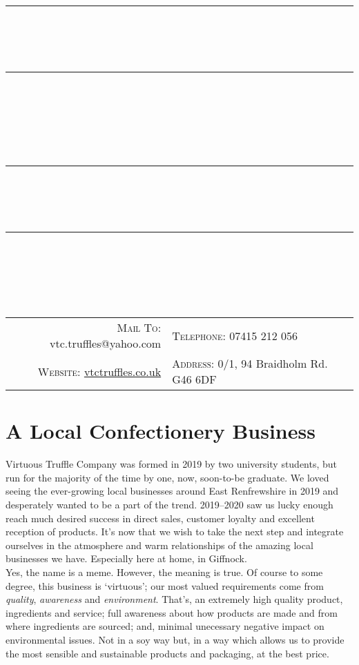 \documentclass[11pt, english]{article}
\newcommand{\HRule}[1]{\rule{\linewidth}{#1}}
\begin{document}

	\title{
		\HRule{0.5pt}\\ [-0.7cm]
		\HRule{0.5pt}\\ [-0.125cm]
		\Huge{}\\
		\Large{}
		\HRule{0.5pt}\\ [-0.7cm]
		\HRule{0.5pt}\\ [-1.5cm]
		}
        \author{\textit{}}
        \date{}
        \maketitle

\begin{center}
	\scriptsize
\begin{tabular}{r|l}
	\textsc{Mail To:} vtc.truffles@yahoo.com & \textsc{Telephone:} 07415 212 056\\
	\textsc{Website:} \href{http://vtctruffles.co.uk}{vtctruffles.co.uk} & \textsc{Address:} 0/1, 94 Braidholm Rd. G46 6DF\\
\end{tabular}
\end{center}

\section{A Local Confectionery Business}

\footnotesize Virtuous Truffle Company was formed in 2019 by two university students, but run for the majority of the time by one, now, soon-to-be graduate. We loved seeing the ever-growing local businesses around East Renfrewshire in 2019 and desperately wanted to be a part of the trend. 2019--2020 saw us lucky enough reach much desired success in direct sales, customer loyalty and excellent reception of products. It's now that we wish to take the next step and integrate ourselves in the atmosphere and warm relationships of the amazing local businesses we have. Especially here at home, in Giffnock.\\

Yes, the name is a meme. However, the meaning is true. Of course to some degree, this business is `virtuous'; our most valued requirements come from \textit{quality}, \textit{awareness} and \textit{environment}. That's, an extremely high quality product, ingredients and service; full awareness about how products are made and from where ingredients are sourced; and, minimal unecessary negative impact on environmental issues. Not in a soy way but, in a way which allows us to provide the most sensible and sustainable products and packaging, at the best price.
\end{document}
